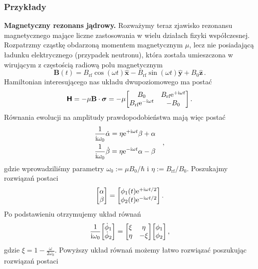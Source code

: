\documentclass{myclass}
\begin{document}
\subsubsection{Przykłady}

\textbf{Magnetyczny rezonans jądrowy.} Rozważymy teraz zjawisko rezonansu magnetycznego mające
liczne zastosowania w wielu działach fizyki współczesnej. Rozpatrzmy cząstkę obdarzoną momentem
magnetycznym \(\mu\), lecz nie posiadającą ładunku elektrycznego (przypadek neutronu), która została
umieszczona w wirującym z częstością radiową polu magnetycznym
\begin{equation*}
    \mathbf{B}(t) = B_\text{rf}\cos(\omega t)\mathbf{\hat{x}} - B_\text{rf}\sin(\omega t) \mathbf{\hat{y}} + B_0\mathbf{\hat{z}}\,.
\end{equation*}
Hamiltonian interesującego nas układu dwupoziomowego ma postać
\begin{equation*}
    \oper{H} = -\mu\mathbf{B}\cdot\boldsymbol{\sigma} = -\mu\mqty[B_0 & B_\text{rf}\e^{+\im\omega t} \\ B_\text{rf}\e^{-\im\omega t} & -B_0]\,.
\end{equation*}
Równania ewolucji na amplitudy prawdopodobieństwa mają więc postać
\begin{equation*}
    \begin{split}
        &\frac{1}{\mathrm{i}\omega_0}\dot{\alpha} =\eta\mathrm{e}^{+\mathrm{i}\omega t}\beta + \alpha \\
        &\frac{1}{\mathrm{i}\omega_0}\dot{\beta} = \eta\mathrm{e}^{-\mathrm{i}\omega t}\alpha - \beta
    \end{split}\quad,
\end{equation*}
gdzie wprowadziliśmy parametry \(\omega_0 := \mu B_0 / \hbar\) i \(\eta := B_\text{rf}/B_0\).
Poszukajmy rozwiązań postaci
\begin{equation*}
    \mqty[\alpha\\\beta] = \mqty[\phi_1(t)\e^{+\im\omega t/2} \\ \phi_2(t)\e^{-\im\omega t/2}]\,.
\end{equation*}
Po podstawieniu otrzymujemy układ równań
\begin{equation*}
    \frac{1}{\im\omega_0}\mqty[\dot{\phi}_1 \\ \dot{\phi}_2] = \mqty[\xi & \eta \\ \eta & -\xi]\mqty[\phi_1 \\ \phi_2]\,,
\end{equation*}
gdzie \(\xi = 1 - \frac{\omega}{2\omega_0}\). Powyższy układ równań możemy łatwo rozwiązać
poszukując rozwiązań postaci
\end{document}
